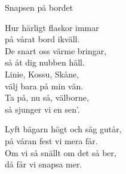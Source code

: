 \begin{song}{Snapsen på bordet}
	
	
	
	
	Hur härligt flaskor immar\\
	på vårat bord ikväll.\\
	De snart oss värme bringar,\\
	så åt dig nubben häll.\\
	Linie, Kossu, Skåne,\\
	välj bara på min vän.\\
	Ta på, nu så, välborne,\\
	så sjunger vi en sen'.
	
	Lyft bägarn högt och säg gutår,\\
	på våran fest vi mera får.\\
	Om vi så snällt om det så ber,\\
	då får vi snapsa mer.
	
\end{song}
